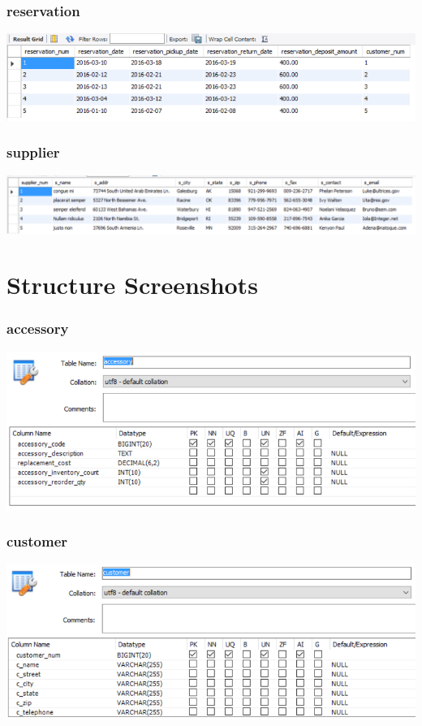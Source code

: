 \documentclass[12pt]{article}
\begin{document}
\subsubsection*{reservation} \includegraphics[scale=0.65]{screenshots/tables/reservation_snip.PNG} \\
\subsubsection*{supplier} \includegraphics[scale=0.65]{screenshots/tables/supplier_snip.PNG} \\

\section*{Structure Screenshots}
\subsubsection*{accessory} \includegraphics[scale=0.55]{screenshots/structure/accessory.PNG} \\
\subsubsection*{customer} \includegraphics[scale=0.55]{screenshots/structure/customer.PNG} \\
\end{document}
